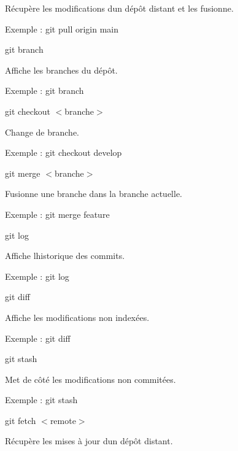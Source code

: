 \begin{DoxyEnumerate}
\begin{DoxyItemize}
\item Récupère les modifications d\textquotesingle{}un dépôt distant et les fusionne.
\item Exemple \+: {\ttfamily git pull origin main}
\end{DoxyItemize}
\item {\ttfamily git branch}
\begin{DoxyItemize}
\item Affiche les branches du dépôt.
\item Exemple \+: {\ttfamily git branch}
\end{DoxyItemize}
\item {\ttfamily git checkout $<$branche$>$}
\begin{DoxyItemize}
\item Change de branche.
\item Exemple \+: {\ttfamily git checkout develop}
\end{DoxyItemize}
\item {\ttfamily git merge $<$branche$>$}
\begin{DoxyItemize}
\item Fusionne une branche dans la branche actuelle.
\item Exemple \+: {\ttfamily git merge feature}
\end{DoxyItemize}
\item {\ttfamily git log}
\begin{DoxyItemize}
\item Affiche l\textquotesingle{}historique des commits.
\item Exemple \+: {\ttfamily git log}
\end{DoxyItemize}
\item {\ttfamily git diff}
\begin{DoxyItemize}
\item Affiche les modifications non indexées.
\item Exemple \+: {\ttfamily git diff}
\end{DoxyItemize}
\item {\ttfamily git stash}
\begin{DoxyItemize}
\item Met de côté les modifications non commitées.
\item Exemple \+: {\ttfamily git stash}
\end{DoxyItemize}
\item {\ttfamily git fetch $<$remote$>$}
\begin{DoxyItemize}
\item Récupère les mises à jour d\textquotesingle{}un dépôt distant.

\end{DoxyItemize}
\end{DoxyEnumerate}
